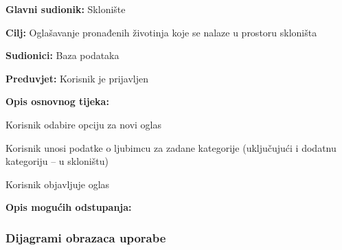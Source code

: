 					\pagebreak
					\noindent {}
					\begin{packed_item}
						
						\item \textbf{Glavni sudionik: }Sklonište
						\item  \textbf{Cilj:} Oglašavanje pronađenih životinja koje se nalaze u prostoru skloništa
						\item  \textbf{Sudionici:} Baza podataka
						\item  \textbf{Preduvjet:} Korisnik je prijavljen
						\item  \textbf{Opis osnovnog tijeka:}
						
						\item[] \begin{packed_enum}
							
							\item Korisnik odabire opciju za novi oglas
							\item Korisnik unosi podatke o ljubimcu za zadane kategorije (uključujući i dodatnu kategoriju – u skloništu)
							\item Korisnik objavljuje oglas
						\end{packed_enum}
						
						\item  \textbf{Opis mogućih odstupanja:}
						
					\end{packed_item}
					
				
					
				\pagebreak
				\subsubsection{Dijagrami obrazaca uporabe}
					

